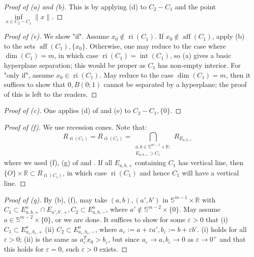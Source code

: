\begin{proof}[Proof of (a) and (b)]
	This is by applying (d) to $C_2-C_1$ and the point $\underset{x\in C_2-C_1}{\operatorname{inf}}\|x\|$.
\end{proof}
\begin{proof}[Proof of (e)]
	We show "if". Assume $x_0\notin \operatorname{ri}(C_1)$. If $x_0\notin \operatorname{aff}(C_1)$, apply (b) to the sets $\operatorname{aff}(C_1),\{x_0\}$. Otherwise, one may reduce to the case where $\dim(C_1)=m$, in which case $\operatorname{ri}(C_1)=\operatorname{int}(C_1)$, so (a) gives a basic hyperplane separation; this would be proper as $C_1$ has non-empty interior. For "only if", assume $x_0\in \operatorname{ri}(C_1)$. May reduce to the case $\dim(C_1)=m$, then it suffices to show that $0,B(0;1)$ cannot be separated by a hyperplane; the proof of this is left to the readers.
\end{proof}
\begin{proof}[Proof of (c)]
	One applies (d) of  and (e) to $C_2-C_1,\{0\}$.
\end{proof}
\begin{proof}[Proof of (f)]
	We use recession cones. Note that:
	\[
		R_{\operatorname{ri}(C_1)}=
		R_{\operatorname{cl}(C_1)}=
		\bigcap_{\substack{a,b\in \mathbb{S}^{m-1}\times \mathbb{R}:\\E_{a,b,+}\supset C_1}}R_{E_{a,b,+}}
	\]
	where we used (f), (g) of  and . If all $E_{a,b,+}$ containing $C_1$ has vertical line, then $\{O\}\times\mathbb{R}\subset R_{\operatorname{ri}(C_1)}$, in which case $\operatorname{ri}(C_1)$ and hence $C_1$ will have a vertical line.
\end{proof}
\begin{proof}[Proof of (g)]
	By (b), (f), may take $(a,b),(a',b')$ in $\mathbb{S}^{m-1}\times \mathbb{R}$ with $C_1\subset E^o_{a,b,+}\cap E_{a',b',+},C_2\subset E^o_{a,b,-}$, where $a'\notin \mathbb{S}^{m-2}\times \{0\}$. May assume $a\in \mathbb{S}^{m-2}\times \{0\}$, or we are done. It suffices to show for some $\varepsilon >0$ that (i) $C_1\subset E^o_{a_\varepsilon,b_\varepsilon,+}$ (ii) $C_2\subset E^o_{a_\varepsilon,b_\varepsilon,-}$, where $a_\varepsilon:=a+\varepsilon a',b_\varepsilon:=b+\varepsilon b'$. (i) holds for all $\varepsilon >0$; (ii) is the same as $a_\varepsilon^T x_0>b_\varepsilon $, but since $a_\varepsilon\to a,b_\varepsilon \to 0$ as $\varepsilon \to 0^+$ and that this holds for $\varepsilon =0$, such $\varepsilon >0$ exists.
\end{proof}

